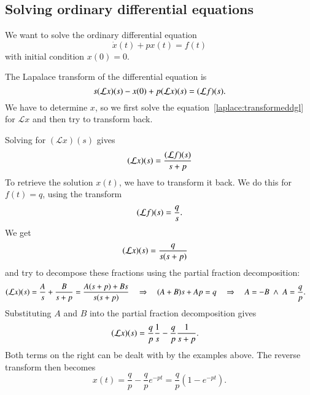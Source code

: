 \subsection{Solving ordinary differential equations}
We want to solve the ordinary differential equation
\[
\dot x(t)+px(t)=f(t)
\]
with initial condition $x(0)=0$.

The Lapalace transform of the differential equation is
\begin{equation}
s({\cal L}x)(s)-x(0)+p({\cal L}x)(s)=({\cal L}f)(s).
\label{laplace:transformeddgl}
\end{equation}
We have to determine $x$, so we first solve the
equation~\eqref{laplace:transformeddgl} for $\mathcal{L}x$ and
then try to transform back.

Solving for $(\mathcal{L}x)(s)$ gives
\[
({\cal L}x)(s)
=
\frac{({\cal L}f)(s)}{s+p}
\]
To retrieve the solution $x(t)$, we have to transform it back.
We do this for $f(t)=q$, using the transform
\[
({\cal L}f)(s)=\frac{q}{s}.
\]
We get
\begin{align*}
({\cal L}x)(s)
&=
\frac{q}{s(s+p)}
\end{align*}
and try to decompose these fractions using the partial fraction
decomposition:
\begin{align*}
({\cal L}x)(s)
&=
\frac{A}{s} + \frac{B}{s+p}
=
\frac{A(s+p) + Bs}{s(s+p)}
\quad\Rightarrow\quad
(A+B)s + Ap = q
\quad\Rightarrow\quad
A=-B\;\wedge\; A=\frac{q}{p}.
\end{align*}
Substituting $A$ and $B$ into the partial fraction decomposition gives
\begin{align*}
({\cal L}x)(s)
&=
\frac{q}{p}\frac{1}{s}-\frac{q}{p}\frac{1}{s+p}.
\end{align*}
Both terms on the right can be dealt with by the examples
above.
The reverse transform then becomes
\[
x(t)=\frac{q}{p}-\frac{q}{p}e^{-pt}=\frac{q}{p}(1-e^{-pt}).
\]

